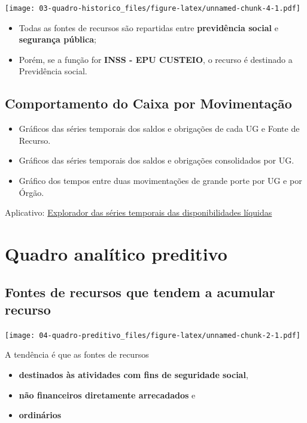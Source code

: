 \documentclass[]{book}
\providecommand{\tightlist}{%
  \setlength{\itemsep}{0pt}\setlength{\parskip}{0pt}}
\begin{document}
\texttt{[image: 03-quadro-historico\_files/figure-latex/unnamed-chunk-4-1.pdf]}

\begin{itemize}
\tightlist
\item
  Todas as fontes de recursos são repartidas entre \textbf{previdência social} e \textbf{segurança pública};
\item
  Porém, se a função for \textbf{INSS - EPU CUSTEIO}, o recurso é destinado a Previdência social.
\end{itemize}

\hypertarget{comportamento-do-caixa-por-movimentacao}{%
\section{Comportamento do Caixa por Movimentação}\label{comportamento-do-caixa-por-movimentacao}}

\begin{itemize}
\tightlist
\item
  Gráficos das séries temporais dos saldos e obrigações de cada UG e Fonte de Recurso.
\item
  Gráficos das séries temporais dos saldos e obrigações consolidados por UG.
\item
  Gráfico dos tempos entre duas movimentações de grande porte por UG e por Órgão.
\end{itemize}

Aplicativo: \href{https://rseis.shinyapps.io/explorador_disponibilidades_liquidas}{Explorador das séries temporais das disponibilidades líquidas}

\hypertarget{quadro-analitico-preditivo}{%
\chapter{Quadro analítico preditivo}\label{quadro-analitico-preditivo}}

\hypertarget{fontes-de-recursos-que-tendem-a-acumular-recurso}{%
\section{Fontes de recursos que tendem a acumular recurso}\label{fontes-de-recursos-que-tendem-a-acumular-recurso}}

\texttt{[image: 04-quadro-preditivo\_files/figure-latex/unnamed-chunk-2-1.pdf]}

A tendência é que as fontes de recursos

\begin{itemize}
\tightlist
\item
  \textbf{destinados às atividades com fins de seguridade social},
\item
  \textbf{não financeiros diretamente arrecadados} e
\item
  \textbf{ordinários}
\end{itemize}
\end{document}

